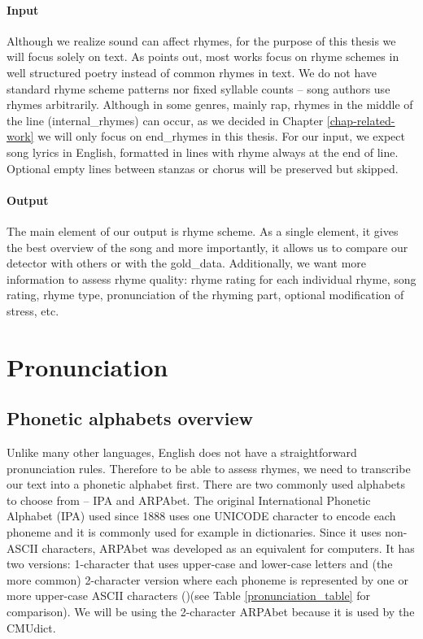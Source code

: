 \paragraph{Input}
Although we realize sound can affect rhymes, for the purpose of this thesis we will focus solely on text. As \cite{rhymes_overview} points out, most works focus on rhyme schemes in well structured poetry instead of common rhymes in text. We do not have standard rhyme scheme patterns nor fixed syllable counts -- song authors use rhymes arbitrarily. Although in some genres, mainly rap, rhymes in the middle of the line (\gls{internal_rhyme}s) can occur, as we decided in Chapter \ref{chap-related-work} we will only focus on \gls{end_rhyme}s in this thesis. For our input, we expect song lyrics in English, formatted in lines with rhyme always at the end of line. Optional empty lines between stanzas or chorus will be preserved but skipped.

\paragraph{Output}
The main element of our output is rhyme scheme. As a single element, it gives the best overview of the song and more importantly, it allows us to compare our detector with others or with the \gls{gold_data}. Additionally, we want more information to assess rhyme quality: rhyme rating for each individual rhyme, song rating, rhyme type, pronunciation of the rhyming part, optional modification of stress, etc.


\section{Pronunciation}
\subsection{Phonetic alphabets overview}
Unlike many other languages, English does not have a straightforward pronunciation rules. Therefore to be able to assess rhymes, we need to transcribe our text into a phonetic alphabet first. There are two commonly used alphabets to choose from -- IPA and ARPAbet. The original International Phonetic Alphabet (IPA) used since 1888 uses one UNICODE character to encode each phoneme and it is commonly used for example in dictionaries. Since it uses non-ASCII characters, ARPAbet was developed as an equivalent for computers. It has two versions: 1-character that uses upper-case and lower-case letters and (the more common) 2-character version where each phoneme is represented by one or more upper-case ASCII characters (\cite{lea1980trends})(see Table \ref{pronunciation_table} for comparison). We will be using the 2-character ARPAbet because it is used by the CMUdict.


